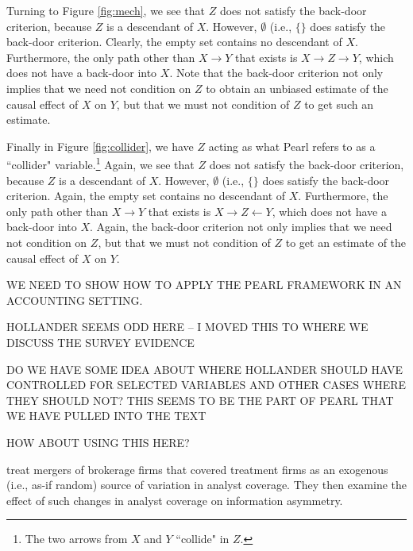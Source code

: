 \documentclass[11pt]{amsart}
\begin{document}

Turning to Figure \ref{fig:mech}, we see that $Z$ does not satisfy the back-door criterion, because $Z$ is a descendant of $X$.
However, $\emptyset$ (i.e., $\{\}$ does satisfy the back-door criterion.
Clearly, the empty set contains no descendant of $X$.
Furthermore, the only path other than $X \rightarrow Y$ that exists is $X \rightarrow Z \rightarrow Y$, which does not have a back-door into $X$.
Note that the back-door criterion not only implies that we need not condition on $Z$ to obtain an unbiased estimate of the causal effect of $X$ on $Y$, but that we must not condition of $Z$ to get such an estimate.


Finally in Figure \ref{fig:collider}, we have $Z$ acting as what Pearl refers to as a ``collider" variable.\footnote{
The two arrows from $X$ and $Y$ ``collide" in $Z$.} %
Again, we see that $Z$ does not satisfy the back-door criterion, because $Z$ is a descendant of $X$.
However, $\emptyset$ (i.e., $\{\}$ does satisfy the back-door criterion.
Again, the empty set contains no descendant of $X$.
Furthermore, the only path other than $X \rightarrow Y$ that exists is $X \rightarrow Z \leftarrow Y$, which does not have a back-door into $X$.
Again, the back-door criterion not only implies that we need not condition on $Z$, but that we must not condition of $Z$ to get an estimate of the causal effect of $X$ on $Y$.

 

WE NEED TO SHOW HOW TO APPLY THE PEARL FRAMEWORK IN AN ACCOUNTING SETTING.

HOLLANDER SEEMS ODD HERE -- I MOVED THIS TO WHERE WE DISCUSS THE SURVEY EVIDENCE

DO WE HAVE SOME IDEA ABOUT WHERE HOLLANDER SHOULD HAVE CONTROLLED FOR SELECTED VARIABLES AND OTHER CASES WHERE THEY SHOULD NOT?  THIS SEEMS TO BE THE PART OF PEARL THAT WE HAVE PULLED INTO THE TEXT

HOW ABOUT USING THIS HERE?

\citet{Kelly:2012ih} treat mergers of brokerage firms that covered treatment firms as an exogenous (i.e., as-if random) source of variation in analyst coverage.%
They then examine the effect of such changes in analyst coverage on information asymmetry.
\end{document}

